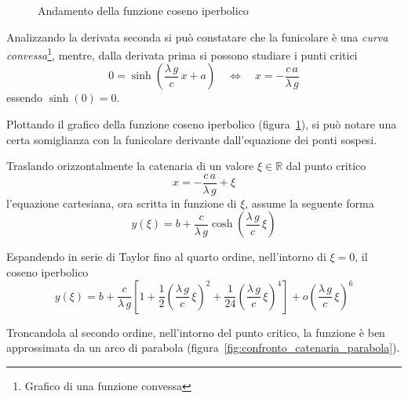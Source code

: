 \begin{figure}
  \centering
  
   \caption{Andamento della funzione coseno iperbolico}
   \label{fig:andamento_coseno_iperbolico}
  
 \end{figure}

Analizzando la derivata seconda si può constatare che la funicolare è una \emph{curva convessa}\footnote{Grafico di una funzione convessa}, mentre, dalla derivata prima si possono studiare i punti critici
\[
 0 = \sinh\left(\dfrac{\lambda\,g}{c}\,x +a\right) \quad \Longleftrightarrow \quad x = -\dfrac{c\,a}{\lambda\,g}
\]
essendo $\sinh(0) = 0$.

Plottando il grafico della funzione coseno iperbolico (figura~\ref{fig:andamento_coseno_iperbolico}), si può notare una certa somiglianza con la funicolare derivante dall'equazione dei ponti sospesi.

Traslando orizzontalmente la catenaria di un valore $\xi\in\mathbb{R}$ dal punto critico 
\[x = -\dfrac{c\,a}{\lambda\,g} + \xi\]
l'equazione cartesiana, ora scritta in funzione di $\xi$, assume la seguente forma
\[
 y(\xi) = b + \dfrac{c}{\lambda\,g}\cosh\left(\dfrac{\lambda\,g}{c}\,\xi\right)
\]

Espandendo in serie di Taylor fino al quarto ordine, nell'intorno di $\xi = 0$, il coseno iperbolico
\[
 y(\xi) = b + \dfrac{c}{\lambda\,g}\left[1 + \dfrac{1}{2}\left(\dfrac{\lambda\,g}{c}\,\xi\right)^2 + \dfrac{1}{24}\left(\dfrac{\lambda\,g}{c}\,\xi\right)^4 \right] + o\left(\dfrac{\lambda\,g}{c}\,\xi\right)^6
\]

Troncandola al secondo ordine, nell'intorno del punto critico, la funzione è ben approssimata da un arco di parabola (figura~\ref{fig:confronto_catenaria_parabola}).



